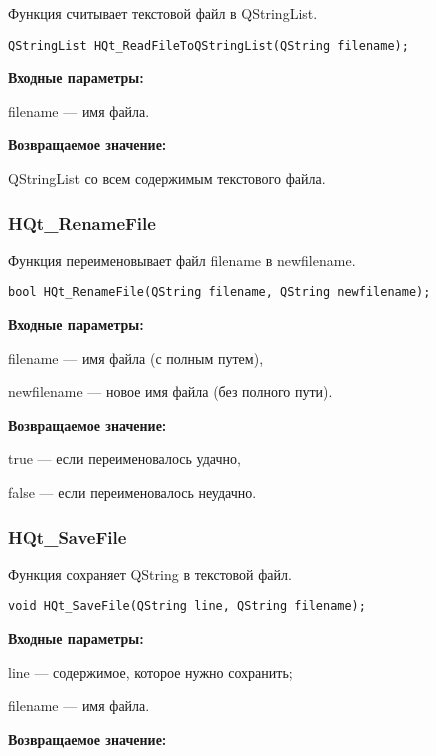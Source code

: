 \documentclass[a4paper,12pt]{article}
\begin{document}
Функция считывает текстовой файл в QStringList.


\begin{lstlisting}[label=code_syntax_HQt_ReadFileToQStringList,caption=Синтаксис]
QStringList HQt_ReadFileToQStringList(QString filename);
\end{lstlisting}

\textbf{Входные параметры:}

filename --- имя файла.

\textbf{Возвращаемое значение:}

QStringList со всем содержимым текстового файла.


\subsubsection{HQt\_RenameFile}\label{HQt_RenameFile}

Функция переименовывает файл filename в newfilename.


\begin{lstlisting}[label=code_syntax_HQt_RenameFile,caption=Синтаксис]
bool HQt_RenameFile(QString filename, QString newfilename);
\end{lstlisting}

\textbf{Входные параметры:}

filename --- имя файла (с полным путем),
 
    newfilename --- новое имя файла (без полного пути).

\textbf{Возвращаемое значение:}

true --- если переименовалось удачно,
 
    false --- если переименовалось неудачно.


\subsubsection{HQt\_SaveFile}\label{HQt_SaveFile}

Функция сохраняет QString в текстовой файл.


\begin{lstlisting}[label=code_syntax_HQt_SaveFile,caption=Синтаксис]
void HQt_SaveFile(QString line, QString filename);
\end{lstlisting}

\textbf{Входные параметры:}

line --- содержимое, которое нужно сохранить;
 
filename --- имя файла.

\textbf{Возвращаемое значение:}
\end{document}
